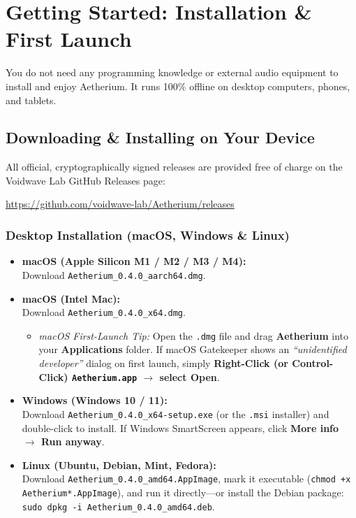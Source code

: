 \documentclass[11pt,oneside,openany]{book}
\begin{document}
\chapter[Getting Started]{Getting Started: Installation \& First Launch}

You do not need any programming knowledge or external audio equipment to install and enjoy Aetherium. It runs 100\% offline on desktop computers, phones, and tablets.

\section{Downloading \& Installing on Your Device}

All official, cryptographically signed releases are provided free of charge on the Voidwave Lab GitHub Releases page:
\begin{center}
  \url{https://github.com/voidwave-lab/Aetherium/releases}
\end{center}

\subsection{Desktop Installation (macOS, Windows \& Linux)}
\begin{itemize}
  \item \textbf{macOS (Apple Silicon M1 / M2 / M3 / M4):}\\
  Download \texttt{Aetherium\_0.4.0\_aarch64.dmg}.
  \item \textbf{macOS (Intel Mac):}\\
  Download \texttt{Aetherium\_0.4.0\_x64.dmg}.
    \begin{itemize}
      \item \textit{macOS First-Launch Tip:} Open the \texttt{.dmg} file and drag \textbf{Aetherium} into your \textbf{Applications} folder. If macOS Gatekeeper shows an \textit{``unidentified developer''} dialog on first launch, simply \textbf{Right-Click (or Control-Click) \texttt{Aetherium.app} $\rightarrow$ select Open}.
    \end{itemize}
  \item \textbf{Windows (Windows 10 / 11):}\\
  Download \texttt{Aetherium\_0.4.0\_x64-setup.exe} (or the \texttt{.msi} installer) and double-click to install. If Windows SmartScreen appears, click \textbf{More info $\rightarrow$ Run anyway}.
  \item \textbf{Linux (Ubuntu, Debian, Mint, Fedora):}\\
  Download \texttt{Aetherium\_0.4.0\_amd64.AppImage}, mark it executable (\texttt{chmod +x Aetherium*.AppImage}), and run it directly---or install the Debian package:\\
  \texttt{sudo dpkg -i Aetherium\_0.4.0\_amd64.deb}.
\end{itemize}
\end{document}
